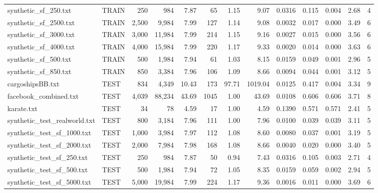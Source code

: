 \begin{table}[t]
{\begin{tabular}{llrrrrrrrrrrr}
synthetic\_sf\_250.txt & TRAIN & 250 & 984 & 7.87 & 65 & 1.15 & 9.07 & 0.0316 & 0.115 & 0.004 & 2.68 & 4 \\
synthetic\_sf\_2500.txt & TRAIN & 2,500 & 9,984 & 7.99 & 127 & 1.14 & 9.08 & 0.0032 & 0.017 & 0.000 & 3.49 & 6 \\
synthetic\_sf\_3000.txt & TRAIN & 3,000 & 11,984 & 7.99 & 214 & 1.15 & 9.16 & 0.0027 & 0.015 & 0.000 & 3.56 & 6 \\
synthetic\_sf\_4000.txt & TRAIN & 4,000 & 15,984 & 7.99 & 220 & 1.17 & 9.33 & 0.0020 & 0.014 & 0.000 & 3.63 & 6 \\
synthetic\_sf\_500.txt & TRAIN & 500 & 1,984 & 7.94 & 61 & 1.03 & 8.15 & 0.0159 & 0.049 & 0.001 & 2.96 & 5 \\
synthetic\_sf\_850.txt & TRAIN & 850 & 3,384 & 7.96 & 106 & 1.09 & 8.66 & 0.0094 & 0.044 & 0.001 & 3.12 & 5 \\
\midrule
cargoshipsBB.txt & TEST & 834 & 4,349 & 10.43 & 173 & 97.71 & 1019.04 & 0.0125 & 0.417 & 0.004 & 3.34 & 9 \\
facebook\_combined.txt & TEST & 4,039 & 88,234 & 43.69 & 1045 & 1.00 & 43.69 & 0.0108 & 0.606 & 0.606 & 3.71 & 8 \\
karate.txt & TEST & 34 & 78 & 4.59 & 17 & 1.00 & 4.59 & 0.1390 & 0.571 & 0.571 & 2.41 & 5 \\
synthetic\_test\_realworld.txt & TEST & 800 & 3,184 & 7.96 & 111 & 1.00 & 7.96 & 0.0100 & 0.039 & 0.039 & 3.11 & 5 \\
synthetic\_test\_sf\_1000.txt & TEST & 1,000 & 3,984 & 7.97 & 112 & 1.08 & 8.60 & 0.0080 & 0.037 & 0.001 & 3.19 & 5 \\
synthetic\_test\_sf\_2000.txt & TEST & 2,000 & 7,984 & 7.98 & 168 & 1.08 & 8.66 & 0.0040 & 0.020 & 0.000 & 3.40 & 5 \\
synthetic\_test\_sf\_250.txt & TEST & 250 & 984 & 7.87 & 50 & 0.94 & 7.43 & 0.0316 & 0.105 & 0.003 & 2.71 & 4 \\
synthetic\_test\_sf\_500.txt & TEST & 500 & 1,984 & 7.94 & 72 & 1.05 & 8.35 & 0.0159 & 0.059 & 0.002 & 2.94 & 5 \\
synthetic\_test\_sf\_5000.txt & TEST & 5,000 & 19,984 & 7.99 & 224 & 1.17 & 9.36 & 0.0016 & 0.011 & 0.000 & 3.69 & 6 \\
\bottomrule
\end{tabular}
}
\end{table}
